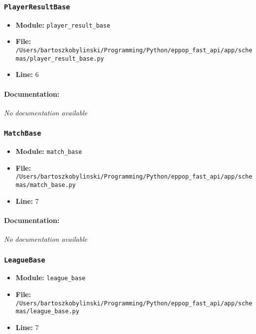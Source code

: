 \documentclass[11pt,a4paper]{article}
\begin{document}
\vspace{1em}
\subsubsection{\texttt{PlayerResultBase}}

\begin{itemize}
    \item \textbf{Module:} \texttt{player\_result\_base}
    \item \textbf{File:} \texttt{/Users/bartoszkobylinski/Programming/Python/eppop\_fast\_api/app/schemas/player\_result\_base.py}
    \item \textbf{Line:} 6
\end{itemize}

\paragraph{Documentation:} \textit{No documentation available}


\vspace{1em}
\subsubsection{\texttt{MatchBase}}

\begin{itemize}
    \item \textbf{Module:} \texttt{match\_base}
    \item \textbf{File:} \texttt{/Users/bartoszkobylinski/Programming/Python/eppop\_fast\_api/app/schemas/match\_base.py}
    \item \textbf{Line:} 7
\end{itemize}

\paragraph{Documentation:} \textit{No documentation available}


\vspace{1em}
\subsubsection{\texttt{LeagueBase}}

\begin{itemize}
    \item \textbf{Module:} \texttt{league\_base}
    \item \textbf{File:} \texttt{/Users/bartoszkobylinski/Programming/Python/eppop\_fast\_api/app/schemas/league\_base.py}
    \item \textbf{Line:} 7
\end{itemize}
\end{document}
